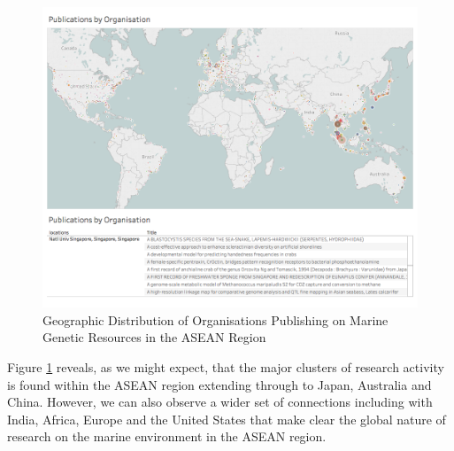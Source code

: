 \documentclass[]{book}
\theoremstyle{definition}
\theoremstyle{definition}
\theoremstyle{definition}
\theoremstyle{remark}
\begin{document}
\begin{figure}

{\centering \includegraphics[width=1\linewidth]{images/aseanmarinlit_organisation} 

}

\caption{Geographic Distribution of Organisations Publishing on Marine Genetic Resources in the ASEAN Region}\label{fig:organisationmap}
\end{figure}

Figure \ref{fig:organisationmap} reveals, as we might expect, that the
major clusters of research activity is found within the ASEAN region
extending through to Japan, Australia and China. However, we can also
observe a wider set of connections including with India, Africa, Europe
and the United States that make clear the global nature of research on
the marine environment in the ASEAN region.
\end{document}
